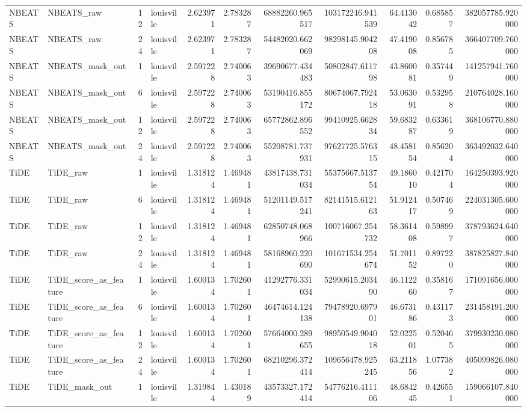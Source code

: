 \begin{longtable}{llrlrrrrrrr}
NBEATS & NBEATS\_raw & 12 & louisville & 2.623971 & 2.783287 & 68882260.965517 & 103172246.941539 & 64.413042 & 0.685857 & 382057785.920000 \\
NBEATS & NBEATS\_raw & 24 & louisville & 2.623971 & 2.783287 & 54482020.662069 & 98298145.904208 & 47.419008 & 0.856785 & 366407709.760000 \\
NBEATS & NBEATS\_mask\_out & 1 & louisville & 2.597228 & 2.740063 & 39690677.434483 & 50802847.611798 & 43.860081 & 0.357449 & 141257941.760000 \\
NBEATS & NBEATS\_mask\_out & 6 & louisville & 2.597228 & 2.740063 & 53190416.855172 & 80674067.792418 & 53.063091 & 0.532958 & 210764028.160000 \\
NBEATS & NBEATS\_mask\_out & 12 & louisville & 2.597228 & 2.740063 & 65772862.896552 & 99410925.662834 & 59.683287 & 0.633619 & 368106770.880000 \\
NBEATS & NBEATS\_mask\_out & 24 & louisville & 2.597228 & 2.740063 & 55208781.737931 & 97627725.576315 & 48.458154 & 0.856204 & 363492032.640000 \\
TiDE & TiDE\_raw & 1 & louisville & 1.318124 & 1.469481 & 43817438.731034 & 55375667.513754 & 49.186010 & 0.421704 & 164250393.920000 \\
TiDE & TiDE\_raw & 6 & louisville & 1.318124 & 1.469481 & 51201149.517241 & 82141515.612163 & 51.912417 & 0.507469 & 224031305.600000 \\
TiDE & TiDE\_raw & 12 & louisville & 1.318124 & 1.469481 & 62850748.068966 & 100716067.254732 & 58.361408 & 0.598997 & 378793624.640000 \\
TiDE & TiDE\_raw & 24 & louisville & 1.318124 & 1.469481 & 58168960.220690 & 101671534.254674 & 51.701152 & 0.897220 & 387825827.840000 \\
TiDE & TiDE\_score\_as\_feature & 1 & louisville & 1.600134 & 1.702601 & 41292776.331034 & 52990615.203490 & 46.112260 & 0.358167 & 171091656.000000 \\
TiDE & TiDE\_score\_as\_feature & 6 & louisville & 1.600134 & 1.702601 & 46474614.124138 & 79478920.697901 & 46.673186 & 0.431173 & 231458191.200000 \\
TiDE & TiDE\_score\_as\_feature & 12 & louisville & 1.600134 & 1.702601 & 57664000.289655 & 98950549.904018 & 52.022501 & 0.520465 & 379930230.080000 \\
TiDE & TiDE\_score\_as\_feature & 24 & louisville & 1.600134 & 1.702601 & 68210296.372414 & 109656478.925245 & 63.211856 & 1.077382 & 405099826.080000 \\
TiDE & TiDE\_mask\_out & 1 & louisville & 1.319844 & 1.430189 & 43573327.172414 & 54776216.411106 & 48.684245 & 0.426551 & 159066107.840000 \\

\end{longtable}
